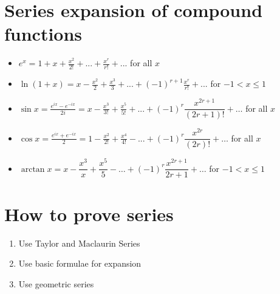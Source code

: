 \section{Series expansion of compound functions}
\begin{itemize}
	\item $e^{x}=1+x+\frac{x^{2}}{2!}+...+\frac{x^{r}}{r!}+...$ for all $x$
	\item $\ln(1+x) = x - \frac{x^{2}}{2} + \frac{x^{3}}{3} + ... + (-1)^{r+1}\frac{x^{r}}{r!} +...$ for $-1<x\leq1$
	\item $\sin x = \frac{e^{ix}-e^{-ix}}{2i}=x-\frac{x^{3}}{3!}+\frac{x^{5}}{5!}+...+(-1)^r\dfrac{x^{2r+1}}{(2r+1)!}+\dots$ for all $x$
	\item $\cos x = \frac{e^{ix}+e^{-ix}}{2}=1-\frac{x^{2}}{2!}+\frac{x^{4}}{4!}-...+(-1)^r\dfrac{x^{2r}}{(2r)!}+\dots$ for all $x$
	\item $\arctan x = x-\dfrac{x^3}{x}+\dfrac{x^5}{5}-\dots+(-1)^r\dfrac{x^{2r+1}}{2r+1}+\dots$ for $-1<x\leq1$
\end{itemize}

\section{How to prove series}
\begin{enumerate}
	\item Use Taylor and Maclaurin Series
	\item Use basic formulae for expansion
	\item Use geometric series
\end{enumerate}